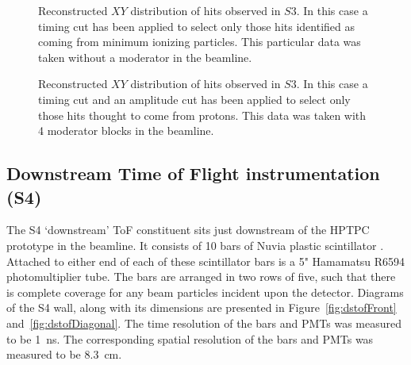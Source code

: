 \begin{figure}[t]
	\begin{minipage}[t]{0.49\textwidth}
		\centering
		\begin{adjustbox}{max totalsize={\textwidth}{.5\textheight},center}
			
		\end{adjustbox}
		\caption{Reconstructed $XY$ distribution of hits observed in $S3$. In this case a timing cut has been applied to select only those hits identified as coming from minimum ionizing particles. This particular data was taken without a moderator in the beamline.}
		\label{fig:s3XY_pion}
	\end{minipage} 	
	\hfill
	\begin{minipage}[t]{0.49\textwidth}
		\centering
		\begin{adjustbox}{max totalsize={\textwidth}{.5\textheight},center}
			
		\end{adjustbox}
		\caption{Reconstructed $XY$ distribution of hits observed in $S3$. In this case a timing cut and an amplitude cut has been applied to select only those hits thought to come from protons. This data was taken with 4 moderator blocks in the beamline.}
		\label{fig:s3XY_proton}
	\end{minipage}
\end{figure}
  
    

    



\subsection{Downstream Time of Flight instrumentation (S4)}
	
The S4 `downstream' ToF constituent sits just downstream of the HPTPC prototype in the beamline. It consists of 10 bars of Nuvia plastic scintillator \cite{NUVIA}. Attached to either end of each of these scintillator bars is a 5" Hamamatsu R6594 photomultiplier tube. The bars are arranged in two rows of five, such that there is complete coverage for any beam particles incident upon the detector. Diagrams of the S4 wall, along with its dimensions are presented in Figure~\ref{fig:dstofFront} and~\ref{fig:dstofDiagonal}. The time resolution of the bars and PMTs was measured to be 1~ns. The corresponding spatial resolution of the bars and PMTs was measured to be 8.3~cm.
    
